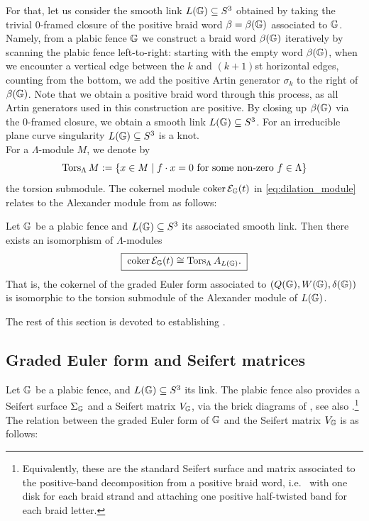 For that, let us consider the smooth link $L(\mathbb G)\subseteq S^3$ obtained by taking the trivial 0-framed closure of the positive braid word $\beta=\beta(\mathbb G)$ associated to $\mathbb G$. Namely, from a plabic fence $\mathbb G$ we construct a braid word $\beta(\mathbb G)$ iteratively by scanning the plabic fence left-to-right: starting with the empty word $\beta(\mathbb G)$, when we encounter a vertical edge between the $k$ and $(k+1)$st horizontal edges, counting from the bottom, we add the positive Artin generator $\sigma_k$ to the right of $\beta(\mathbb G)$. Note that we obtain a positive braid word through this process, as all Artin generators used in this construction are positive. By closing up $\beta(\mathbb G)$ via the 0-framed closure, we obtain a smooth link $L(\mathbb G)\subseteq S^3$. For an irreducible plane curve singularity $L(\mathbb G)\subseteq S^3$ is a knot.\\

For a $\Lambda$-module $M$, we denote by 
\[
   \operatorname{Tors}_{\Lambda}M
   :=\{x\in M\mid f\cdot x=0\text{ for some non-zero }f\in\Lambda\}
\]
the torsion submodule. The cokernel module $\operatorname{coker}\mathcal E_{\mathbb G}(t)$ in \eqref{eq:dilation_module} relates to the Alexander module from  as follows:

\begin{theorem}\label{prop:dil_module_is_Alexander}
Let $\mathbb G$ be a plabic fence and $L(\mathbb G)\subseteq S^3$ its associated smooth link. Then there exists an isomorphism of $\Lambda$-modules
\begin{equation}\label{eq:coker_module_is_Alexander}
   \boxed{\;\operatorname{coker}\mathcal E_{\mathbb G}(t)\cong\operatorname{Tors}_\Lambda A_{L(\mathbb G)}.\;}
\end{equation}
That is, the cokernel of the graded Euler form associated to $(Q(\mathbb G),W(\mathbb G),\delta(\mathbb G))$ is isomorphic to the torsion submodule of the Alexander module of $L(\mathbb G)$.
\end{theorem}

The rest of this section is devoted to establishing .\\

\subsection{Graded Euler form and Seifert matrices}\label{ssec:graded_Euler_Seifert} Let $\mathbb G$ be a plabic fence, and $L(\mathbb G)\subseteq S^3$ its link. The plabic fence also provides a Seifert surface $\Sigma_\mathbb G$ and a Seifert matrix $V_\mathbb G$, via the brick diagrams of \cite[Section 3]{BaaderDehornoy}, see also \cite[Section 2]{Ferretti}.\footnote{Equivalently, these are the standard Seifert surface and matrix associated to the positive-band
decomposition from a positive braid word, i.e.~ with one disk for each braid strand and attaching one positive half-twisted
band for each braid letter.} The relation between the graded Euler form of $\mathbb G$ and the Seifert matrix $V_\mathbb G$ is as follows:

